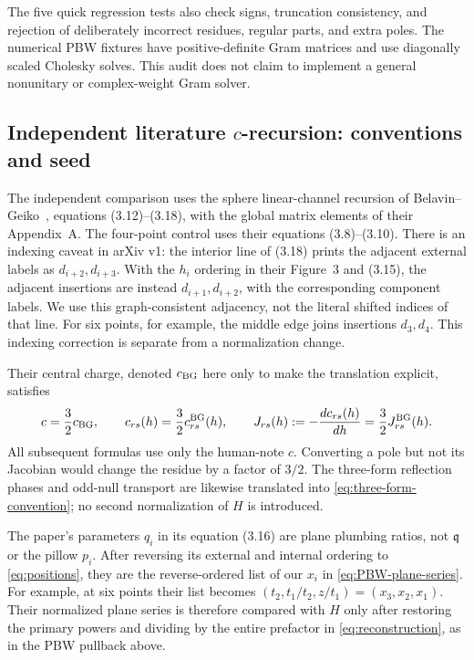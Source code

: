 \documentclass[11pt]{article}
\numberwithin{equation}{section}
\newcommand{\fq}{\mathfrak q}
\begin{document}
The five quick regression tests also check signs, truncation consistency,
and rejection of deliberately incorrect residues, regular parts, and
extra poles. The numerical PBW fixtures have positive-definite Gram
matrices and use diagonally scaled Cholesky solves. This audit does not
claim to implement a general nonunitary or complex-weight Gram solver.

\subsection{Independent literature \texorpdfstring{$c$}{c}-recursion: conventions and seed}
\label{sec:c-literature}

The independent comparison uses the sphere linear-channel recursion of
Belavin--Geiko~\cite{BG}, equations (3.12)--(3.18), with the global
matrix elements of their Appendix~A. The four-point control uses their
equations (3.8)--(3.10). There is an indexing caveat in arXiv v1:
the interior line of (3.18) prints the adjacent external labels as
$d_{i+2},d_{i+3}$. With the $h_i$ ordering in their Figure~3 and
(3.15), the adjacent insertions are instead $d_{i+1},d_{i+2}$,
with the corresponding component labels. We use this graph-consistent
adjacency, not the literal shifted indices of that line. For six
points, for example, the middle edge joins insertions $d_3,d_4$.
This indexing correction is separate from a normalization change.

Their central charge, denoted $c_{\rm BG}$ here
only to make the translation explicit, satisfies
\begin{equation}
 c=\frac32c_{\rm BG},\qquad
 c_{rs}(h)=\frac32c^{\rm BG}_{rs}(h),\qquad
 J_{rs}(h):=-\frac{dc_{rs}(h)}{dh}
           =\frac32J^{\rm BG}_{rs}(h).
 \label{eq:c-charge-conversion}
\end{equation}
All subsequent formulas use only the human-note $c$. Converting a pole
but not its Jacobian would change the residue by a factor of $3/2$.
The three-form reflection phases and odd-null transport are likewise
translated into \eqref{eq:three-form-convention}; no second normalization
of $H$ is introduced.

The paper's parameters $q_i$ in its equation (3.16) are plane plumbing
ratios, not $\fq$ or the pillow $p_i$. After reversing its external and
internal ordering to \eqref{eq:positions}, they are the reverse-ordered
list of our $x_i$ in \eqref{eq:PBW-plane-series}. For example, at six points
their list becomes $(t_2,t_1/t_2,z/t_1)=(x_3,x_2,x_1)$.
Their normalized plane series is therefore compared with $H$ only after
restoring the primary powers and dividing by the entire prefactor in
\eqref{eq:reconstruction}, as in the PBW pullback above.
\end{document}
